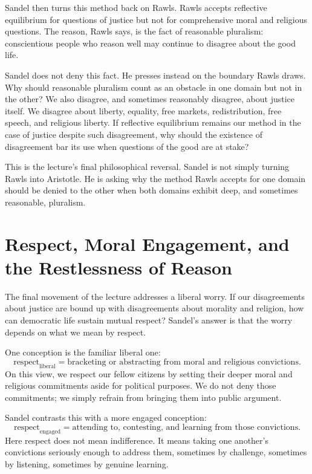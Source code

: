 Sandel then turns this method back on Rawls. Rawls accepts reflective equilibrium for questions of justice but not for comprehensive moral and religious questions. The reason, Rawls says, is the fact of reasonable pluralism: conscientious people who reason well may continue to disagree about the good life.

Sandel does not deny this fact. He presses instead on the boundary Rawls draws. Why should reasonable pluralism count as an obstacle in one domain but not in the other? We also disagree, and sometimes reasonably disagree, about justice itself. We disagree about liberty, equality, free markets, redistribution, free speech, and religious liberty. If reflective equilibrium remains our method in the case of justice despite such disagreement, why should the existence of disagreement bar its use when questions of the good are at stake?

This is the lecture's final philosophical reversal. Sandel is not simply turning Rawls into Aristotle. He is asking why the method Rawls accepts for one domain should be denied to the other when both domains exhibit deep, and sometimes reasonable, pluralism.

\section{Respect, Moral Engagement, and the Restlessness of Reason}

The final movement of the lecture addresses a liberal worry. If our disagreements about justice are bound up with disagreements about morality and religion, how can democratic life sustain mutual respect? Sandel's answer is that the worry depends on what we mean by respect.

One conception is the familiar liberal one:
\begin{equation}
\text{respect}_{\mathrm{liberal}}
=
\text{bracketing or abstracting from moral and religious convictions}.
\end{equation}
On this view, we respect our fellow citizens by setting their deeper moral and religious commitments aside for political purposes. We do not deny those commitments; we simply refrain from bringing them into public argument.

Sandel contrasts this with a more engaged conception:
\begin{equation}
\text{respect}_{\mathrm{engaged}}
=
\text{attending to, contesting, and learning from those convictions}.
\end{equation}
Here respect does not mean indifference. It means taking one another's convictions seriously enough to address them, sometimes by challenge, sometimes by listening, sometimes by genuine learning.

